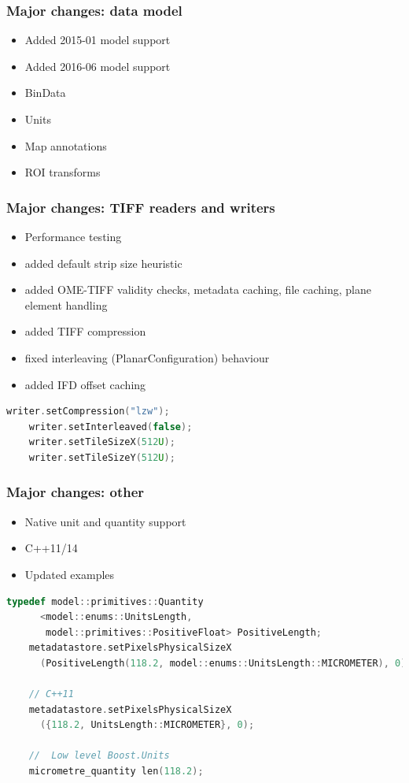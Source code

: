 \documentclass{beamer}
\begin{document}
\begin{frame}[fragile]
  \frametitle{Major changes: data model}

  \begin{itemize}
  \item Added 2015-01 model support
  \item Added 2016-06 model support
    \pause
  \item BinData
  \item Units
  \item Map annotations
  \item ROI transforms
  \end{itemize}
\end{frame}

\begin{frame}[fragile]
  \frametitle{Major changes: TIFF readers and writers}

  \begin{itemize}
  \item Performance testing
  \item added default strip size heuristic
  \item added OME-TIFF validity checks, metadata caching, file caching, plane element handling
  \item added TIFF compression
  \item fixed interleaving (PlanarConfiguration) behaviour
  \item added IFD offset caching
  \end{itemize}

  \begin{lstlisting}[language=C++]
    writer.setCompression("lzw");
    writer.setInterleaved(false);
    writer.setTileSizeX(512U);
    writer.setTileSizeY(512U);
  \end{lstlisting}
\end{frame}

\begin{frame}[fragile]
  \frametitle{Major changes: other}

  \begin{itemize}
  \item Native unit and quantity support
  \item C++11/14
  \item Updated examples
  \end{itemize}
  \pause

  \begin{lstlisting}[language=C++]
    typedef model::primitives::Quantity
      <model::enums::UnitsLength,
       model::primitives::PositiveFloat> PositiveLength;
    metadatastore.setPixelsPhysicalSizeX
      (PositiveLength(118.2, model::enums::UnitsLength::MICROMETER), 0);

    // C++11
    metadatastore.setPixelsPhysicalSizeX
      ({118.2, UnitsLength::MICROMETER}, 0);

    //  Low level Boost.Units
    micrometre_quantity len(118.2);
  \end{lstlisting}
\end{frame}
\end{document}
